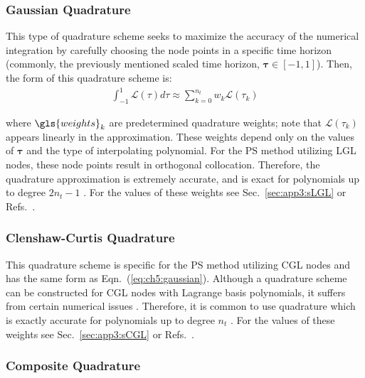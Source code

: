 \subsubsection{Gaussian Quadrature}

This type of quadrature scheme seeks to maximize the accuracy of the numerical integration by carefully choosing the node points in a specific time horizon (commonly, the previously mentioned scaled time horizon, $\bm{\tau} \in [-1,1]$).
Then, the form of this quadrature scheme is:
\begin{align} \label{eq:ch5:gaussian}
\int_{-1}^{1} \mathcal{L}(\tau) d\tau \approx \sum_{k=0}^{n_t} w_k \mathcal{L}(\tau_k)
\end{align}

\noindent where $\gls{weights}_k$ are predetermined quadrature weights; note that $\mathcal{L}(\tau_k)$ appears linearly in the approximation.
These weights depend only on the values of $\bm{\tau}$ and the type of interpolating polynomial.
For the PS method utilizing LGL nodes, these node points result in orthogonal collocation.
Therefore, the quadrature approximation is extremely accurate, and is exact for polynomials up to degree $2n_t - 1$ \cite{Rao2010a}. For the values of these weights see Sec.~\ref{sec:app3:sLGL} or Refs.~\cite{Fahroo2008a, Herber2015a}.

\subsubsection{Clenshaw-Curtis Quadrature}

This quadrature scheme is specific for the PS method utilizing CGL nodes and has the same form as Eqn.~(\ref{eq:ch5:gaussian}).
Although a  quadrature scheme can be constructed for CGL nodes with Lagrange basis polynomials, it suffers from certain numerical issues \cite{Trefethen2008a}.
Therefore, it is common to use  quadrature which is exactly accurate for polynomials up to degree $n_t$ \cite{Trefethen2008a}.
For the values of these weights see Sec.~\ref{sec:app3:sCGL} or Refs.~\cite{Trefethen2008a, Gong2010a, Herber2015a}.

\subsubsection{Composite Quadrature}

